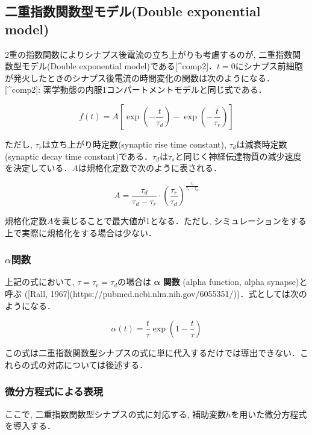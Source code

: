 \subsection{二重指数関数型モデル(Double exponential model)}
2重の指数関数によりシナプス後電流の立ち上がりも考慮するのが, 二重指数関数型モデル(Double exponential model)である[^comp2]．$t=0$にシナプス前細胞が発火したときのシナプス後電流の時間変化の関数は次のようになる．
[^comp2]: 薬学動態の内服1コンパートメントモデルと同じ式である．


\begin{equation}
f(t)=A\left[\exp\left(-\frac{t}{\tau_d}\right)-\exp\left(-\frac{t}{\tau_r}\right)\right]    
\end{equation}


ただし, ${\tau_r}$は立ち上がり時定数(synaptic rise time constant), ${\tau_d}$は減衰時定数(synaptic decay time constant)である．$\tau_{d}$は$\tau_{s}$と同じく神経伝達物質の減少速度を決定している．$A$は規格化定数で次のように表される．


\begin{equation}
A=\frac{\tau_d}{\tau_d-\tau_r}\cdot \left(\frac{\tau_r}{\tau_d}\right)^\frac{\tau_r}{\tau_r-\tau_d}    
\end{equation}


規格化定数$A$を乗じることで最大値が1となる．ただし, シミュレーションをする上で実際に規格化をする場合は少ない．

\subsubsection{$\alpha$関数}
上記の式において, $\tau=\tau_{r}=\tau_{d}$の場合は $\boldsymbol{\alpha}$ \textbf{関数} (alpha function, alpha synapse)と呼ぶ ([Rall, 1967](https://pubmed.ncbi.nlm.nih.gov/6055351/))．式としては次のようになる．


\begin{equation}
\alpha(t)=\frac{t}{\tau}\exp\left(1-\frac{t}{\tau}\right)    
\end{equation}


この式は二重指数関数型シナプスの式に単に代入するだけでは導出できない．これらの式の対応については後述する．

\subsubsection{微分方程式による表現}
ここで, 二重指数関数型シナプスの式に対応する, 補助変数$h$を用いた微分方程式を導入する． 



